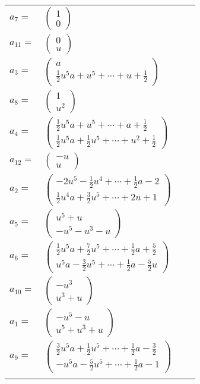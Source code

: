 \documentclass[1p]{elsarticle_modified}
\theoremstyle{definition}
\begin{document}
\begin{tabular}{m{7pt} m{180pt} m{7pt} m{180pt} }
\flushright $a_{7}=$&$\begin{pmatrix}1\\0\end{pmatrix}$ \\
\flushright $a_{11}=$&$\begin{pmatrix}0\\u\end{pmatrix}$ \\
\flushright $a_{3}=$&$\begin{pmatrix}a\\\frac{1}{2} u^5 a+u^5+\cdots+u+\frac{1}{2}\end{pmatrix}$ \\
\flushright $a_{8}=$&$\begin{pmatrix}1\\u^2\end{pmatrix}$ \\
\flushright $a_{4}=$&$\begin{pmatrix}\frac{1}{2} u^5 a+u^5+\cdots+a+\frac{1}{2}\\\frac{1}{2} u^5 a+\frac{1}{2} u^5+\cdots+u^2+\frac{1}{2}\end{pmatrix}$ \\
\flushright $a_{12}=$&$\begin{pmatrix}- u\\u\end{pmatrix}$ \\
\flushright $a_{2}=$&$\begin{pmatrix}-2 u^5-\frac{1}{2} u^4+\cdots+\frac{1}{2} a-2\\\frac{1}{2} u^4 a+\frac{3}{2} u^5+\cdots+2 u+1\end{pmatrix}$ \\
\flushright $a_{5}=$&$\begin{pmatrix}u^5+u\\- u^5- u^3- u\end{pmatrix}$ \\
\flushright $a_{6}=$&$\begin{pmatrix}\frac{1}{2} u^5 a+\frac{7}{2} u^5+\cdots+\frac{1}{2} a+\frac{5}{2}\\u^5 a-\frac{3}{2} u^5+\cdots+\frac{1}{2} a-\frac{5}{2} u\end{pmatrix}$ \\
\flushright $a_{10}=$&$\begin{pmatrix}- u^3\\u^3+u\end{pmatrix}$ \\
\flushright $a_{1}=$&$\begin{pmatrix}- u^5- u\\u^5+u^3+u\end{pmatrix}$ \\
\flushright $a_{9}=$&$\begin{pmatrix}\frac{3}{2} u^5 a+\frac{1}{2} u^5+\cdots+\frac{1}{2} a-\frac{3}{2}\\- u^5 a-\frac{5}{2} u^5+\cdots+\frac{1}{2} a-1\end{pmatrix}$\\&\end{tabular}
\end{document}
